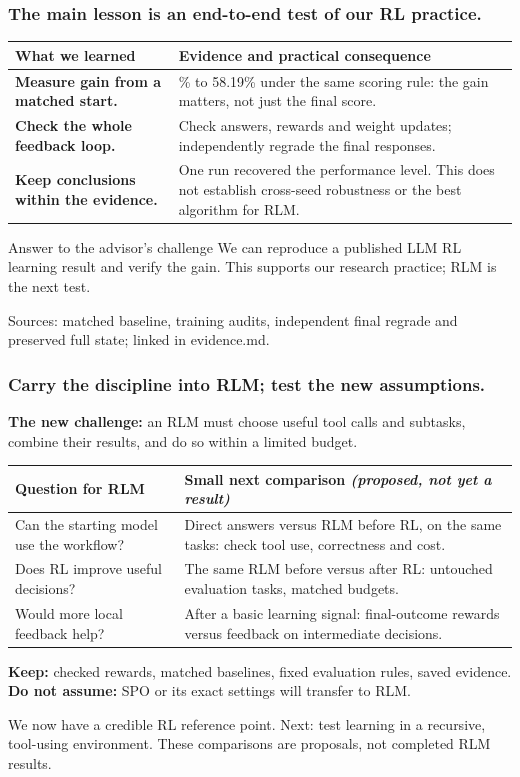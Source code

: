 \documentclass[aspectratio=169,11pt]{beamer}
\newcommand{\source}[1]{\vfill{\scriptsize\color{Gray}#1\par}}
\begin{document}
\begin{frame}[t]
\frametitle{The main lesson is an end-to-end test of our RL practice.}
\begin{tabular}{@{}>{\raggedright\arraybackslash}p{}>{\raggedright\arraybackslash}p{}@{}}
\toprule
What we learned & Evidence and practical consequence\\
\midrule
\textbf{Measure gain from a matched start.} &
39.77\% to 58.19\% under the same scoring rule:
the gain matters, not just the final score.\\[2mm]
\textbf{Check the whole feedback loop.} &
Check answers, rewards and weight updates;
independently regrade the final responses.\\[2mm]
\textbf{Keep conclusions within the evidence.} &
One run recovered the performance level. This does not establish
cross-seed robustness or the best algorithm for RLM.\\
\bottomrule
\end{tabular}
\medskip
\begin{block}{Answer to the advisor's challenge}
We can reproduce a published LLM RL learning result and verify the gain.
This supports our research practice; RLM is the next test.
\end{block}
\source{Sources: matched baseline, training audits, independent final regrade and preserved full state; linked in evidence.md.}
\end{frame}

\begin{frame}[t]
\frametitle{Carry the discipline into RLM; test the new assumptions.}
\textbf{The new challenge:} an RLM must choose useful tool calls and subtasks,
combine their results, and do so within a limited budget.
\medskip
\begin{tabular}{@{}>{\raggedright\arraybackslash}p{}>{\raggedright\arraybackslash}p{}@{}}
\toprule
Question for RLM & Small next comparison \textit{(proposed, not yet a result)}\\
\midrule
Can the starting model use the workflow? &
Direct answers versus RLM before RL, on the same tasks:
check tool use, correctness and cost.\\[2mm]
Does RL improve useful decisions? &
The same RLM before versus after RL:
untouched evaluation tasks, matched budgets.\\[2mm]
Would more local feedback help? &
After a basic learning signal: final-outcome rewards
versus feedback on intermediate decisions.\\
\bottomrule
\end{tabular}
\medskip
\textbf{Keep:} checked rewards, matched baselines, fixed evaluation rules, saved evidence.\\
\textbf{Do not assume:} SPO or its exact settings will transfer to RLM.
\source{We now have a credible RL reference point. Next: test learning in a recursive, tool-using environment. These comparisons are proposals, not completed RLM results.}
\end{frame}
\end{document}
